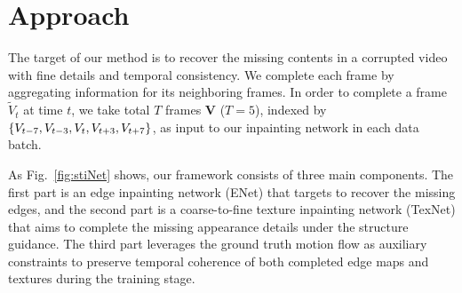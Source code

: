 

\section{Approach}\label{sec:approach}

The target of our method is to recover the missing contents in a corrupted video with fine details and temporal consistency.
%
We complete each frame by aggregating information for its neighboring frames. 
In order to complete a frame $\widetilde{V}_t$ at time $t$, we take total $T$ frames $\boldsymbol{V}$ ($T=5$), indexed by $\{V_{t-7},V_{t-3},V_{t},V_{t+3},V_{t+7}\}$, as input to our inpainting network in each data batch. 

As Fig.~\ref{fig:stiNet} shows, our framework consists of three main components. 
The first part is an edge inpainting network (ENet) that targets to recover the missing edges, and the second part is a coarse-to-fine texture inpainting network (TexNet) that aims to complete the missing appearance details under the structure guidance.
The third part leverages the ground truth motion flow as auxiliary constraints to preserve temporal coherence of both completed edge maps and textures during the training stage.

